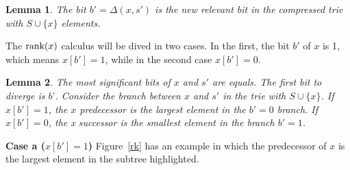 \documentclass[11pt]{article}
\newtheorem{lema}{Lemma}
\newcommand{\rk}[1]{\mbox{\rm{rank}}(#1)}
\newcommand{\dlt}[2]{\Delta(#1,#2)}
\begin{document}
\begin{lema} 
The bit $b'=\dlt{x}{s'}$ is the new relevant bit in the compressed trie with $S\cup\{x\}$ elements.
\end{lema}

The $\rk{x}$ calculus will be dived in two cases. In the first, the bit $b'$  of $x$ is 1, which means $x[b']=1$, while in the second case $x[b']=0$.





\begin{lema} 
The most significant bits of $x$ and $s'$ are equals. The first bit to diverge is $b’$. Consider the branch between $x$ and $s'$ in the trie with $S\cup\{x\}$. If  $x[b']=1$, the $x$ predecessor is the largest element in the $b'=0$ branch. If $x[b']=0$, the x successor is the smallest element in the branch $b'=1$.
\end{lema}



\textbf{Case a ($x[b']=1$)} Figure~\ref{rk} has an example in which the predecessor of $x$ is the largest element in the subtree highlighted.
\end{document}

